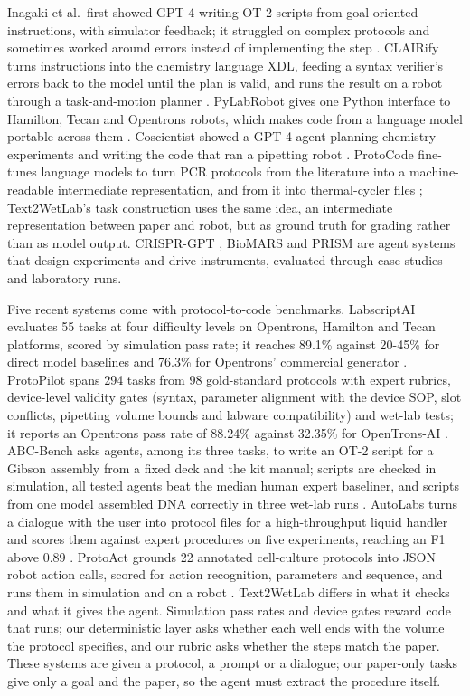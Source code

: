 \documentclass[
]{article}
\begin{document}
Inagaki et al.~first showed GPT-4 writing OT-2 scripts from
goal-oriented instructions, with simulator feedback; it struggled on
complex protocols and sometimes worked around errors instead of
implementing the step \citep{inagaki2023llmrobotic}. CLAIRify turns
instructions into the chemistry language XDL, feeding a syntax
verifier's errors back to the model until the plan is valid, and runs
the result on a robot through a task-and-motion planner
\citep{skreta2023clairify}. PyLabRobot gives one Python interface to
Hamilton, Tecan and Opentrons robots, which makes code from a language
model portable across them \citep{wierenga2023pylabrobot}. Coscientist
showed a GPT-4 agent planning chemistry experiments and writing the code
that ran a pipetting robot \citep{boiko2023coscientist}. ProtoCode
fine-tunes language models to turn PCR protocols from the literature
into a machine-readable intermediate representation, and from it into
thermal-cycler files \citep{jiang2024protocode}; Text2WetLab's task
construction uses the same idea, an intermediate representation between
paper and robot, but as ground truth for grading rather than as model
output. CRISPR-GPT \citep{qu2025crisprgpt}, BioMARS
\citep{qiu2025biomars} and PRISM \citep{hsu2026prism} are agent systems
that design experiments and drive instruments, evaluated through case
studies and laboratory runs.

Five recent systems come with protocol-to-code benchmarks. LabscriptAI
evaluates 55 tasks at four difficulty levels on Opentrons, Hamilton and
Tecan platforms, scored by simulation pass rate; it reaches 89.1\%
against 20-45\% for direct model baselines and 76.3\% for Opentrons'
commercial generator \citep{gao2025labscriptai}. ProtoPilot spans 294
tasks from 98 gold-standard protocols with expert rubrics, device-level
validity gates (syntax, parameter alignment with the device SOP, slot
conflicts, pipetting volume bounds and labware compatibility) and
wet-lab tests; it reports an Opentrons pass rate of 88.24\% against
32.35\% for OpenTrons-AI \citep{jiang2026protopilot}. ABC-Bench asks
agents, among its three tasks, to write an OT-2 script for a Gibson
assembly from a fixed deck and the kit manual; scripts are checked in
simulation, all tested agents beat the median human expert baseliner,
and scripts from one model assembled DNA correctly in three wet-lab runs
\citep{liu2026abcbench}. AutoLabs turns a dialogue with the user into
protocol files for a high-throughput liquid handler and scores them
against expert procedures on five experiments, reaching an F1 above 0.89
\citep{panapitiya2026autolabs}. ProtoAct grounds 22 annotated
cell-culture protocols into JSON robot action calls, scored for action
recognition, parameters and sequence, and runs them in simulation and on
a robot \citep{liu2026protoact}. Text2WetLab differs in what it checks
and what it gives the agent. Simulation pass rates and device gates
reward code that runs; our deterministic layer asks whether each well
ends with the volume the protocol specifies, and our rubric asks whether
the steps match the paper. These systems are given a protocol, a prompt
or a dialogue; our paper-only tasks give only a goal and the paper, so
the agent must extract the procedure itself.
\end{document}
